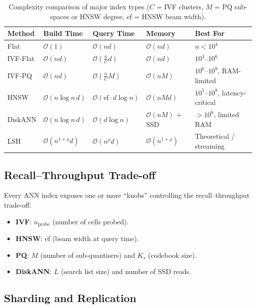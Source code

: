 \documentclass[11pt,a4paper]{article}
\theoremstyle{definition}
\newcommand{\calO}{\mathcal{O}}
\begin{document}
\begin{table}[H]
\centering
\small
\begin{tabular}{@{}lllll@{}}
\toprule
\textbf{Method} & \textbf{Build Time} & \textbf{Query Time} & \textbf{Memory} & \textbf{Best For} \\
\midrule
Flat          & $\calO(1)$    & $\calO(nd)$      & $\calO(nd)$ & $n < 10^4$ \\
IVF-Flat      & $\calO(nd)$   & $\calO(\frac{n}{C}d)$ & $\calO(nd)$ & $10^4$--$10^6$ \\
IVF-PQ        & $\calO(nd)$   & $\calO(\frac{n}{C}M)$ & $\calO(nM)$ & $10^6$--$10^9$, RAM-limited \\
HNSW          & $\calO(n\log n\,d)$ & $\calO(\mathrm{ef}\cdot d\log n)$ & $\calO(nMd)$ & $10^5$--$10^8$, latency-critical \\
DiskANN       & $\calO(n\log n\,d)$ & $\calO(d\log n)$ & $\calO(nM)$ + SSD & $>10^8$, limited RAM \\
LSH           & $\calO(n^{1+\rho}d)$ & $\calO(n^\rho d)$ & $\calO(n^{1+\rho})$ & Theoretical / streaming \\
\bottomrule
\end{tabular}
\caption{Complexity comparison of major index types ($C$ = IVF clusters, $M$ = PQ sub-spaces or HNSW degree, $\mathrm{ef}$ = HNSW beam width).}
\end{table}

\subsection{Recall--Throughput Trade-off}

Every ANN index exposes one or more ``knobs'' controlling the
recall--throughput trade-off:
\begin{itemize}[nosep]
  \item \textbf{IVF}: $n_{\text{probe}}$ (number of cells probed).
  \item \textbf{HNSW}: $\mathrm{ef}$ (beam width at query time).
  \item \textbf{PQ}: $M$ (number of sub-quantisers) and $K_s$ (codebook
    size).
  \item \textbf{DiskANN}: $L$ (search list size) and number of SSD
    reads.
\end{itemize}

\subsection{Sharding and Replication}
\end{document}
